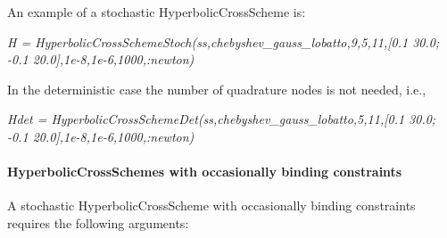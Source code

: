 \documentclass[notitlepage,11pt]{article}
\begin{document}
\bigskip

An example of a stochastic HyperbolicCrossScheme is:

\bigskip

\textit{H =
HyperbolicCrossSchemeStoch(ss,chebyshev\_gauss\_lobatto,9,5,11,[0.1 30.0;
-0.1 20.0],1e-8,1e-6,1000,:newton)}

\bigskip

In the deterministic case the number of quadrature nodes is not needed, i.e.,

\bigskip

\textit{Hdet =
HyperbolicCrossSchemeDet(ss,chebyshev\_gauss\_lobatto,5,11,[0.1 30.0; -0.1
20.0],1e-8,1e-6,1000,:newton)}

\paragraph{HyperbolicCrossSchemes with occasionally binding constraints}

A stochastic HyperbolicCrossScheme with occasionally binding constraints
requires the following arguments:
\end{document}
